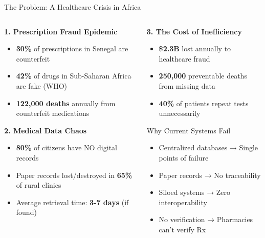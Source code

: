 \documentclass[aspectratio=169,xcolor=dvipsnames,14pt]{beamer}
\newcommand{\crossitem}{\item[\color{DangerRed}\faTimesCircle]}
\begin{document}
\begin{frame}{The Problem: A Healthcare Crisis in Africa}

  \begin{columns}[T]
    \begin{column}{0.5\textwidth}
      \textbf{\textcolor{DangerRed}{1. Prescription Fraud Epidemic}}
      \begin{itemize}
        \item \textcolor{DangerRed}{\textbf{30\%}} of prescriptions in Senegal are counterfeit
        \item \textcolor{DangerRed}{\textbf{42\%}} of drugs in Sub-Saharan Africa are fake (WHO)
        \item \textcolor{DangerRed}{\textbf{122,000 deaths}} annually from counterfeit medications
      \end{itemize}

      \vspace{0.3cm}

      \textbf{\textcolor{WarningOrange}{2. Medical Data Chaos}}
      \begin{itemize}
        \item \textbf{80\%} of citizens have NO digital records
        \item Paper records lost/destroyed in \textbf{65\%} of rural clinics
        \item Average retrieval time: \textbf{3-7 days} (if found)
      \end{itemize}
    \end{column}

    \begin{column}{0.5\textwidth}
      \textbf{\textcolor{DangerRed}{3. The Cost of Inefficiency}}
      \begin{itemize}
        \item \textbf{\$2.3B} lost annually to healthcare fraud
        \item \textbf{250,000} preventable deaths from missing data
        \item \textbf{40\%} of patients repeat tests unnecessarily
      \end{itemize}

      \vspace{0.5cm}

      \begin{block}{Why Current Systems Fail}
        \begin{itemize}
          \crossitem Centralized databases → Single points of failure
          \crossitem Paper records → No traceability
          \crossitem Siloed systems → Zero interoperability
          \crossitem No verification → Pharmacies can't verify Rx
        \end{itemize}
      \end{block}
    \end{column}
  \end{columns}


\end{frame}
\end{document}
